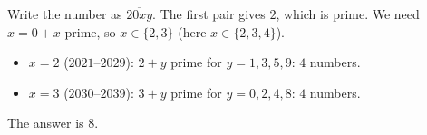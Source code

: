 Write the number as $\overline{20xy}$. The first pair gives $2$, which is prime. We need $x=0+x$ prime, so $x\in\{2,3\}$ (here $x\in\{2,3,4\}$).
\begin{itemize}
\item $x=2$ ($2021$--$2029$): $2+y$ prime for $y=1,3,5,9$: $4$ numbers.
\item $x=3$ ($2030$--$2039$): $3+y$ prime for $y=0,2,4,8$: $4$ numbers.
\end{itemize}
The answer is $\boxed{8}$.

